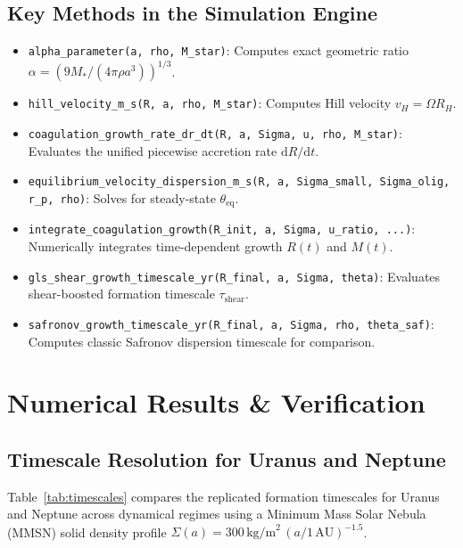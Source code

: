 \documentclass[11pt,a4paper]{article}
\begin{document}
\subsection{Key Methods in the Simulation Engine}
\begin{itemize}
    \item \texttt{alpha\_parameter(a, rho, M\_star)}: Computes exact geometric ratio $\alpha = (9 M_* / (4\pi \rho a^3))^{1/3}$.
    \item \texttt{hill\_velocity\_m\_s(R, a, rho, M\_star)}: Computes Hill velocity $v_H = \Omega R_H$.
    \item \texttt{coagulation\_growth\_rate\_dr\_dt(R, a, Sigma, u, rho, M\_star)}: Evaluates the unified piecewise accretion rate $\mathrm{d}R/\mathrm{d}t$.
    \item \texttt{equilibrium\_velocity\_dispersion\_m\_s(R, a, Sigma\_small, Sigma\_olig, r\_p, rho)}: Solves for steady-state $\theta_{\text{eq}}$.
    \item \texttt{integrate\_coagulation\_growth(R\_init, a, Sigma, u\_ratio, ...)}: Numerically integrates time-dependent growth $R(t)$ and $M(t)$.
    \item \texttt{gls\_shear\_growth\_timescale\_yr(R\_final, a, Sigma, theta)}: Evaluates shear-boosted formation timescale $\tau_{\text{shear}}$.
    \item \texttt{safronov\_growth\_timescale\_yr(R\_final, a, Sigma, rho, theta\_saf)}: Computes classic Safronov dispersion timescale for comparison.
\end{itemize}

\section{Numerical Results \& Verification}

\subsection{Timescale Resolution for Uranus and Neptune}
Table~\ref{tab:timescales} compares the replicated formation timescales for Uranus and Neptune across dynamical regimes using a Minimum Mass Solar Nebula (MMSN) solid density profile $\Sigma(a) = 300\,\text{kg/m}^2 \, (a / 1\,\text{AU})^{-1.5}$.
\end{document}
